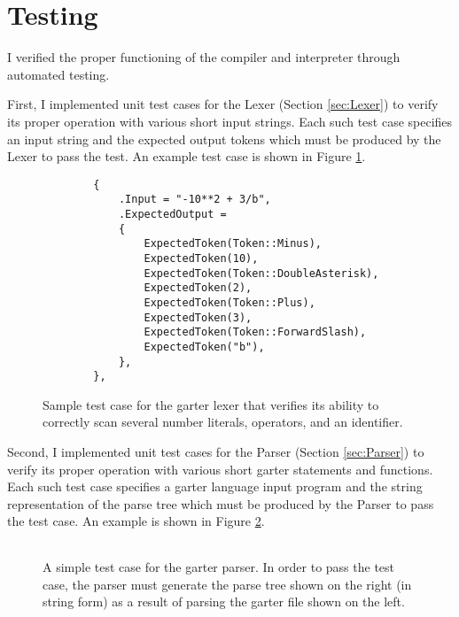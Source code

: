\documentclass[11pt]{article}
\begin{document}
\section{Testing}

\label{sec:testing}

I verified the proper functioning of the compiler and interpreter through
automated testing.

First, I implemented unit test cases for the Lexer (Section \ref{sec:Lexer}) to
verify its proper operation with various short input strings.  Each such test
case specifies an input string and the expected output tokens which must be
produced by the Lexer to pass the test.  An example test case is shown in Figure
\ref{fig:TestLexer}.

\begin{figure}
    \lstset{language=C++}
    \begin{lstlisting}
        {
            .Input = "-10**2 + 3/b",
            .ExpectedOutput =
            {
                ExpectedToken(Token::Minus),
                ExpectedToken(10),
                ExpectedToken(Token::DoubleAsterisk),
                ExpectedToken(2),
                ExpectedToken(Token::Plus),
                ExpectedToken(3),
                ExpectedToken(Token::ForwardSlash),
                ExpectedToken("b"),
            },
        },
    \end{lstlisting}
    \caption{Sample test case for the garter lexer that verifies its ability to
        correctly scan several number literals, operators, and an identifier.}
    \label{fig:TestLexer}
\end{figure}

Second, I implemented unit test cases for the Parser (Section \ref{sec:Parser})
to verify its proper operation with various short garter statements and
functions.  Each such test case specifies a garter language input program and
the string representation of the parse tree which must be produced by the Parser
to pass the test case.  An example is shown in Figure \ref{fig:TestParser}.

\begin{figure}
    \begin{tabular}{|p{4cm}|p{11cm}|}
    \hline
    
    &
    
    \\ \hline
    \end{tabular}
    \caption{A simple test case for the garter parser.
        In order to pass the test case, the parser must generate the parse tree
    shown on the right (in string form) as a result of parsing the garter file
    shown on the left.  }
    \label{fig:TestParser}
\end{figure}
\end{document}
